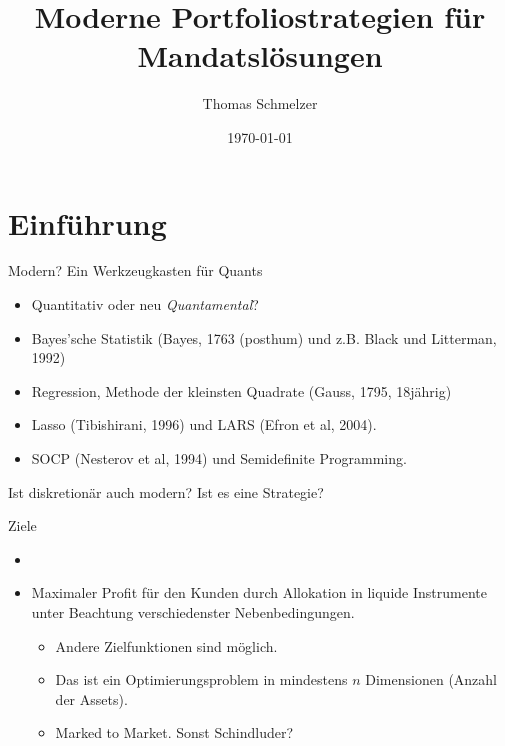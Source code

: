 \documentclass[10pt]{beamer}
\title{Moderne Portfoliostrategien für Mandatslösungen}
\subtitle{}
\date{\today}
\date{}
\author{Thomas Schmelzer}
\institute{Lobnek Wealth Management\\thomas.schmelzer@lobnek.com}
\begin{document}
\maketitle


\section{Einführung}

\begin{frame}{Modern? Ein Werkzeugkasten für Quants}

\begin{itemize}
\item Quantitativ oder neu \textit{Quantamental}?
\item Bayes'sche Statistik (Bayes, 1763 (posthum) und z.B. Black und Litterman, 1992)
\item Regression, Methode der kleinsten Quadrate (Gauss, 1795, 18jährig)
\item Lasso (Tibishirani, 1996) und LARS (Efron et al, 2004).
\item SOCP (Nesterov et al, 1994) und Semidefinite Programming.
\end{itemize}

Ist diskretionär auch modern? Ist es eine Strategie?
\end{frame}

\begin{frame}[fragile]{Ziele}
\begin{itemize}
\item {}
\item Maximaler Profit für den Kunden durch Allokation in liquide Instrumente unter Beachtung verschiedenster Nebenbedingungen.
\begin{itemize}
\item Andere Zielfunktionen sind möglich.
\item Das ist ein Optimierungsproblem in mindestens $n$ Dimensionen (Anzahl der Assets).
\item Marked to Market. Sonst Schindluder? 
\end{itemize}
\end{itemize}
\end{frame}
\end{document}
